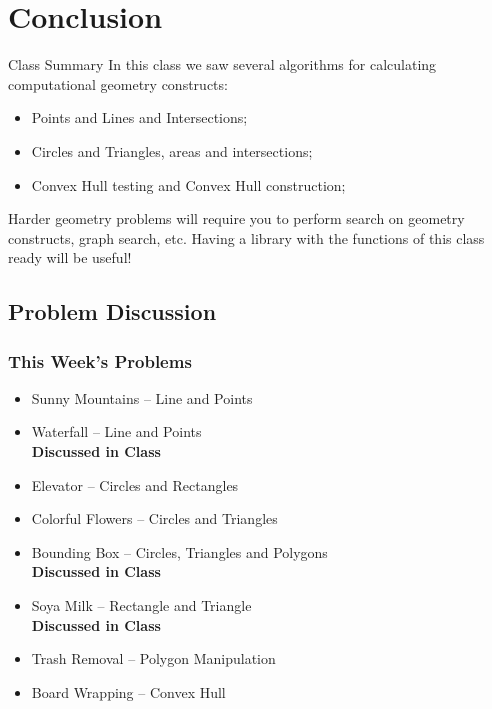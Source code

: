 \section{Conclusion}

\begin{frame}{Class Summary}
  In this class we saw several algorithms for calculating computational geometry constructs:\bigskip

  \begin{itemize}
    \item Points and Lines and Intersections;
    \item Circles and Triangles, areas and intersections;
    \item Convex Hull testing and Convex Hull construction;
  \end{itemize}\bigskip

  Harder geometry problems will require you to perform search on geometry constructs, graph search, etc. Having a library with the functions of this class ready will be useful!
\end{frame}

\subsection{Problem Discussion}
\begin{frame}
  \frametitle{This Week's Problems}
  \begin{itemize}
    \item Sunny Mountains -- Line and Points
    \item Waterfall -- Line and Points\\{\bf Discussed in Class}
    \item Elevator -- Circles and Rectangles
    \item Colorful Flowers -- Circles and Triangles
    \item Bounding Box -- Circles, Triangles and Polygons\\{\bf Discussed in Class}
    \item Soya Milk -- Rectangle and Triangle\\{\bf Discussed in Class}
    \item Trash Removal -- Polygon Manipulation
    \item Board Wrapping -- Convex Hull
  \end{itemize}
\end{frame}

